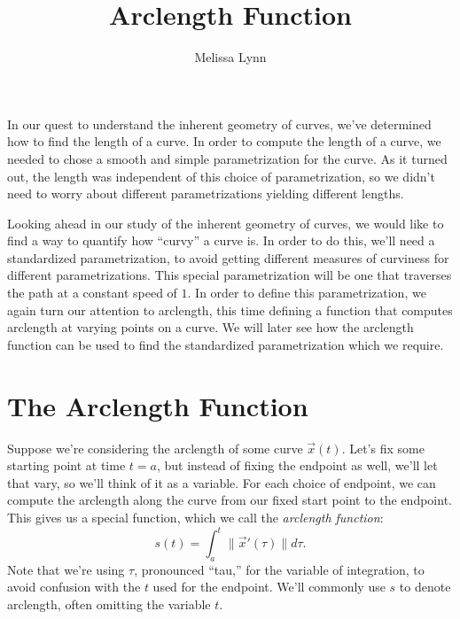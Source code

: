 \documentclass{ximera}
\title{Arclength Function}
\author{Melissa Lynn}
\begin{document}
\begin{abstract}
\end{abstract}
\maketitle

In our quest to understand the inherent geometry of curves, we've determined how to find the length of a curve. In order to compute the length of a curve, we needed to chose a smooth and simple parametrization for the curve. As it turned out, the length was independent of this choice of parametrization, so we didn't need to worry about different parametrizations yielding different lengths.

Looking ahead in our study of the inherent geometry of curves, we would like to find a way to quantify how ``curvy'' a curve is. In order to do this, we'll need a standardized parametrization, to avoid getting different measures of curviness for different parametrizations. This special parametrization will be one that traverses the path at a constant speed of $1$. In order to define this parametrization, we again turn our attention to arclength, this time defining a function that computes arclength at varying points on a curve. We will later see how the arclength function can be used to find the standardized parametrization which we require.

\section*{The Arclength Function}

Suppose we're considering the arclength of some curve $\vec{x}(t)$. Let's fix some starting point at time $t=a$, but instead of fixing the endpoint as well, we'll let that vary, so we'll think of it as a variable. For each choice of endpoint, we can compute the arclength along the curve from our fixed start point to the endpoint. This gives us a special function, which we call the \emph{arclength function}:
\[
s(t) = \int_a^t \|\vec{x}'(\tau)\|d\tau.
\]
Note that we're using $\tau$, pronounced ``tau,'' for the variable of integration, to avoid confusion with the $t$ used for the endpoint. We'll commonly use $s$ to denote arclength, often omitting the variable $t$.

\begin{image}
\end{image}
\end{document}
